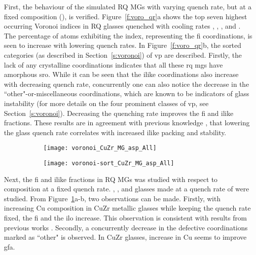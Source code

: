 First, the behaviour of the simulated RQ MGs with varying quench rate, but at a fixed composition (\cz), is verified. Figure~\ref{f:voro_qr}a shows the top seven highest occurring Voronoi indices in \cz  RQ glasses quenched with cooling rates , , , and . The percentage of atoms exhibiting the  index, representing the \gls{fi} coordinations, is seen to increase with lowering quench rates. In Figure~\ref{f:voro_qr}b, the sorted categories (as described in Section~\ref{s:voronoi}) of \gls{vp} are described. Firstly, the lack of any crystalline coordinations indicates that all these \gls{rq} \gls{mg}s have amorphous \gls{sro}. While it can be seen that the \gls{ilike} coordinations also increase with decreasing quench rate, concurrently one can also notice the decrease in the ``other"-or-miscellaneous coordinations, which are known to be indicators of glass instability (for more details on the four prominent classes of \gls{vp}, see Section~\ref{s:voronoi}). Decreasing the quenching rate improves the \gls{fi} and \gls{ilike} fractions. These results are in agreement with previous knowledge \cite{Yue2018,Berthier2016}, that lowering the glass quench rate correlates with increased \gls{ilike} packing and stability. \par

\begin{changebar}
	\begin{figure}[h]
		\centering
		\begin{subfigure}{0.45\linewidth} \centering \texttt{[image: voronoi\_CuZr\_MG\_asp\_All]} 
			\subcaption{} \end{subfigure}%
		\begin{subfigure}{0.45\linewidth} \centering \texttt{[image: voronoi-sort\_CuZr\_MG\_asp\_All]} 
			\subcaption{} \end{subfigure}%
		\label{f:voro_comp}
	\end{figure}
\end{changebar}

Next, the \gls{fi} and \gls{ilike} fractions in RQ MGs was studied with respect to composition at a fixed quench rate. \cz, \czsf, and \czsix  glasses made at a quench rate of  were studied. From Figure~\ref{f:voro_comp}a-b, two observations can be made. Firstly, with increasing Cu composition in CuZr metallic glasses while keeping the quench rate fixed, the \gls{fi} and the \gls{ilo} increase. This observation is consistent with results from previous works \cite{Peng2010,Ritter2012,Li2009a}. Secondly, a concurrently decrease in the defective coordinations marked as ``other" is observed. In CuZr glasses, increase in Cu seems to improve \gls{gfa}. \par

